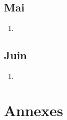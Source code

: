 \documentclass[10pt,a4paper]{book}
\begin{document}
\chapter{Mai}

\begin{enumerate}
    \item 
\end{enumerate}

\chapter{Juin}

\begin{enumerate}
    \item 
\end{enumerate}

\newpage

\part{Annexes}
\end{document}
